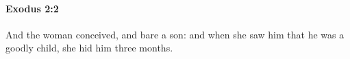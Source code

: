 
		\paragraph{Exodus 2:2} %
			\label{EXODUS-2-2}

			And the woman conceived, and bare a son: and when she saw him that he was a goodly child, she hid him three months.


